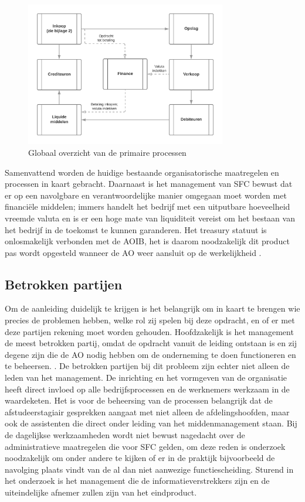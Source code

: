 \documentclass[10pt,a4paper,twoside]{report}
\begin{document}
\begin{figure}[!hb]
    \centering
    \includegraphics[width=0.78\textwidth]{primairproces}
    \caption{Globaal overzicht van de primaire processen}
    \label{fig:primairproces}
\end{figure}

Samenvattend worden de huidige bestaande organisatorische maatregelen en processen in kaart gebracht. Daarnaast is het management van SFC bewust dat er op een navolgbare en verantwoordelijke manier omgegaan moet worden met financiële middelen; immers handelt het bedrijf met een uitputbare hoeveelheid vreemde valuta en is er een hoge mate van liquiditeit vereist om het bestaan van het bedrijf in de toekomst te kunnen garanderen. Het treasury statuut is onlosmakelijk verbonden met de AOIB, het is daarom noodzakelijk dit product pas wordt opgesteld wanneer de AO weer aansluit op de werkelijkheid \citep{watisonderzoek,buunk,financiering}.

\subsection{Betrokken partijen}
Om de aanleiding duidelijk te krijgen is het belangrijk om in kaart te brengen wie precies de problemen hebben, welke rol zij spelen bij deze opdracht, en of er met deze partijen rekening moet worden gehouden. Hoofdzakelijk is het management de meest betrokken partij, omdat de opdracht vanuit de leiding ontstaan is en zij degene zijn die de AO nodig hebben om de onderneming te doen functioneren en te beheersen. \citep{bivperspectief}. De betrokken partijen bij dit probleem zijn echter niet alleen de leden van het management. De inrichting en het vormgeven van de organisatie heeft direct invloed op alle bedrijfsprocessen en de werknemers werkzaam in de waardeketen. Het is voor de beheersing van de processen belangrijk dat de afstudeerstagiair gesprekken aangaat met niet alleen de afdelingshoofden, maar ook de assistenten die direct onder leiding van het middenmanagement staan. Bij de dagelijkse werkzaamheden wordt niet bewust nagedacht over de administratieve maatregelen die voor SFC gelden, om deze reden is onderzoek noodzakelijk om onder andere te kijken of er in de praktijk bijvoorbeeld de navolging plaats vindt van de al dan niet aanwezige functiescheiding. Sturend in het onderzoek is het management die de informatieverstrekkers zijn en de uiteindelijke afnemer zullen zijn van het eindproduct. 
\end{document}
